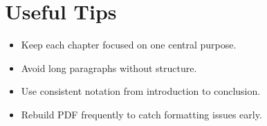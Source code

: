 \section{Useful Tips}

\begin{itemize}
  \item Keep each chapter focused on one central purpose.
  \item Avoid long paragraphs without structure.
  \item Use consistent notation from introduction to conclusion.
  \item Rebuild PDF frequently to catch formatting issues early.
\end{itemize}
